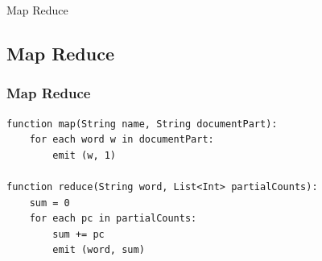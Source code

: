 \documentclass[11pt]{beamer}
\begin{document}
\begin{frame}{Map Reduce}
\subsection{Map Reduce}
\begin{figure}
\end{figure}
\end{frame}

\begin{frame}[fragile]
\frametitle{Map Reduce}
\lstset{
	basicstyle=\footnotesize,
	numbers=left,
	numbersep=5pt,
	showtabs=false,
	title=Wortzahl,
	style=customc
}

\begin{lstlisting}
function map(String name, String documentPart):
	for each word w in documentPart:
		emit (w, 1)
 
function reduce(String word, List<Int> partialCounts):
	sum = 0
	for each pc in partialCounts:
		sum += pc
		emit (word, sum)
		
\end{lstlisting}

\end{frame}
\end{document}
